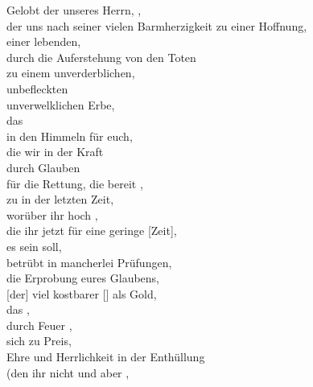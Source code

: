 Gelobt  der    unseres Herrn, ,\\
     der uns nach seiner vielen Barmherzigkeit  zu einer Hoffnung,\\ 
        einer lebenden,\\
        durch die Auferstehung  von den Toten\\
            zu einem unverderblichen, \\
            unbefleckten \\
             unverwelklichen Erbe,\\
    das \\
        in den Himmeln  für euch,\\
        die wir in der Kraft  \\
            durch Glauben   \\
        für die Rettung, die bereit ,\\
         zu  in der letzten Zeit,\\
    worüber ihr hoch ,\\
        die ihr jetzt für eine geringe [Zeit],\\
         es sein soll,\\
        betrübt  in mancherlei Prüfungen,\\
     die Erprobung eures Glaubens, \\
        [der] viel kostbarer [] als Gold,\\
            das , \\
             durch Feuer , \\
        sich  zu Preis, \\
        Ehre und Herrlichkeit in der Enthüllung \\
            (den ihr nicht  und  aber ,\\
